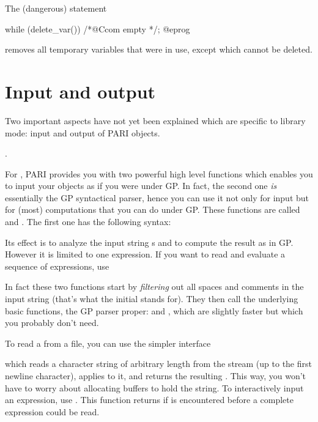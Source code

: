 \noindent
The (dangerous) statement

\bprog
while (delete_var()) /*@Ccom empty */;
@eprog

\noindent removes all temporary variables that were in use, except
 which cannot be deleted.

\section{Input and output}

\noindent
Two important aspects have not yet been explained which are specific to
library mode: input and output of PARI objects.

.

\noindent
For , PARI provides you with two powerful high level functions
which enables you to input your objects as if you were under GP. In fact,
the second one \emph{is} essentially the GP syntactical parser, hence you
can use it not only for input but for (most) computations that you can do
under GP. These functions are called  and . The
first one has the following syntax:\label{se:flisexpr}


\noindent
Its effect is to analyze the input string s and to compute the result as in
GP.  However it is limited to one expression. If you want to read and
evaluate a sequence of expressions, use


\noindent{}
In fact these two functions start by \emph{filtering} out all spaces and
comments in the input string (that's what the initial  stands for).
They then call the underlying basic functions, the GP parser proper:
 and , which are
slightly faster but which you probably don't need.

To read a  from a file, you can use the simpler interface


which reads a character string of arbitrary length from the stream 
(up to the first newline character), applies  to it, and
returns the resulting . This way, you won't have to worry about
allocating buffers to hold the string. To interactively input an expression,
use . This function returns  if  is
encountered before a complete expression could be read.

